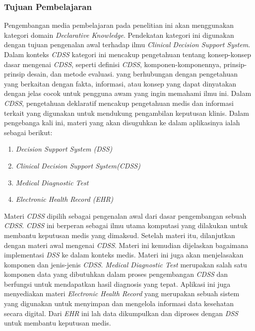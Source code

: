 \subsubsection{Tujuan Pembelajaran}
Pengembangan media pembelajaran pada penelitian ini akan menggunakan kategori domain \textit{Declarative Knowledge}. 
Pendekatan kategori ini digunakan dengan tujuan pengenalan awal terhadap ilmu \textit{Clinical Decision Support System}.
Dalam konteks \textit{CDSS} kategori ini mencakup pengetahuan tentang konsep-konsep dasar mengenai \textit{CDSS}, seperti definisi \textit{CDSS}, komponen-komponennya, prinsip-prinsip desain, dan metode evaluasi.
yang berhubungan dengan pengetahuan yang berkaitan dengan fakta, informasi, atau konsep yang dapat dinyatakan dengan jelas cocok untuk pengguna awam yang ingin memahami ilmu ini. Dalam \textit{CDSS}, pengetahuan deklaratif mencakup pengetahuan medis dan informasi terkait yang digunakan untuk mendukung pengambilan keputusan klinis.
Dalam pengebanga kali ini, materi yang akan disuguhkan ke dalam aplikasinya ialah sebagai berikut:
\begin{enumerate}
	\item \textit{Decision Support System (DSS)}
	\item \textit{Clinical Decision Support System(CDSS)}
	\item \textit{Medical Diagnostic Test}
	\item \textit{Electronic Health Record (EHR)}
\end{enumerate}
Materi \textit{CDSS} dipilih sebagai pengenalan awal dari dasar pengembangan sebuah \textit{CDSS}. 
\textit{CDSS} ini berperan sebagai ilmu utama komputasi yang dilakukan untuk membantu keputusan medis yang dimaksud.
Setelah materi itu, dilanjutkan dengan materi awal mengenai \textit{CDSS}. Materi ini kemudian dijelaskan bagaimana implementasi \textit{DSS} ke dalam konteks medis.
Materi ini juga akan menjelasakan komponen dan jenis-jenis \textit{CDSS}.
\textit{Medical Diagnostic Test} merupakan salah satu komponen data yang dibutuhkan dalam proses pengembangan \textit{CDSS} dan berfungsi untuk mendapatkan hasil diagnosis yang tepat.
Aplikasi ini juga menyediakan materi \textit{Electronic Health Record} yang merupakan sebuah sistem yang digunakan untuk menyimpan dan mengelola informasi data kesehatan secara digital.
Dari \textit{EHR} ini lah data dikumpulkan dan diproses dengan \textit{DSS} untuk membantu keputusan medis.




